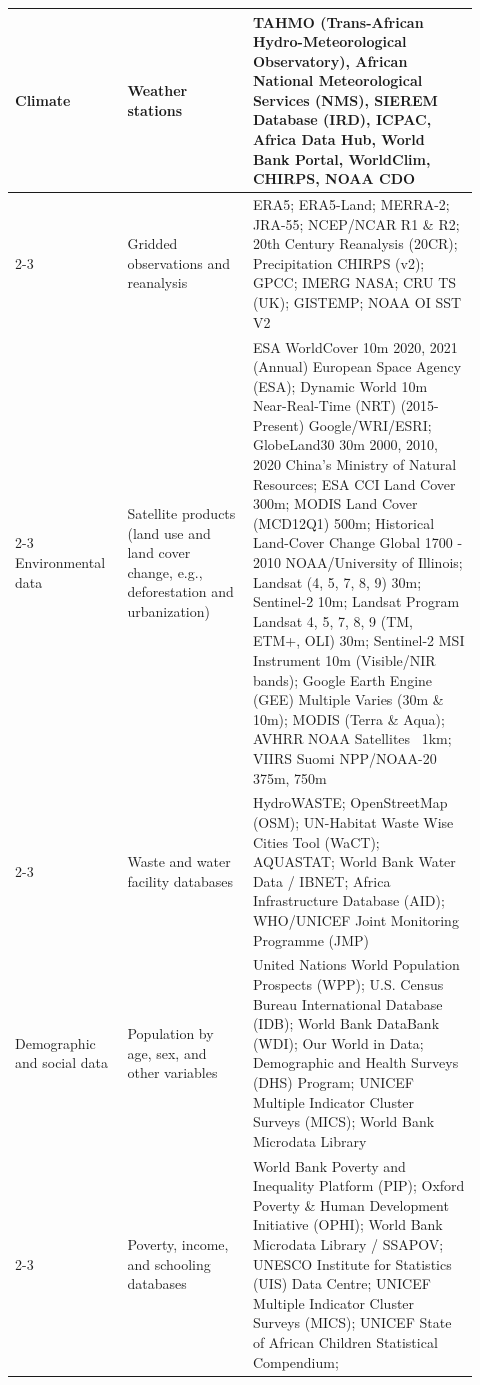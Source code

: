 \documentclass{article}
\begin{document}
\begin{longtable}{|p{0.22\linewidth}|p{0.25\linewidth}|p{0.45\linewidth}|}
    Climate & 
    Weather stations & 
    TAHMO (Trans-African Hydro-Meteorological Observatory), 
    African National Meteorological Services (NMS), 
    SIEREM Database (IRD), ICPAC, Africa Data Hub, World Bank Portal, WorldClim, CHIRPS, NOAA CDO \\
    \cline{2-3}
    & 
    Gridded observations and reanalysis & 
    ERA5; ERA5-Land; MERRA-2; JRA-55; NCEP/NCAR R1 \& R2; 
    20th Century Reanalysis (20CR); Precipitation CHIRPS (v2); 
    GPCC; IMERG NASA; CRU TS (UK); GISTEMP; NOAA OI SST V2 \\
    \cline{2-3}
    Environmental data &
    Satellite products (land use and land cover change, e.g., deforestation and urbanization) &
    ESA WorldCover 10m 2020, 2021 (Annual) European Space Agency (ESA);
    Dynamic World 10m Near-Real-Time (NRT) (2015-Present) Google/WRI/ESRI;
    GlobeLand30 30m 2000, 2010, 2020 China's Ministry of Natural Resources;
    ESA CCI Land Cover 300m;
    MODIS Land Cover (MCD12Q1) 500m;
    Historical Land-Cover Change Global 1700 - 2010 NOAA/University of Illinois;
    Landsat (4, 5, 7, 8, 9) 30m;
    Sentinel-2 10m;
    Landsat Program Landsat 4, 5, 7, 8, 9 (TM, ETM+, OLI) 30m;
    Sentinel-2 MSI Instrument 10m (Visible/NIR bands);
    Google Earth Engine (GEE) Multiple Varies (30m \& 10m);
    MODIS (Terra \& Aqua);
    AVHRR NOAA Satellites ~1km;
    VIIRS Suomi NPP/NOAA-20 375m, 750m \\
    \cline{2-3}
    &
    Waste and water facility databases &
    HydroWASTE;
    OpenStreetMap (OSM);
    UN-Habitat Waste Wise Cities Tool (WaCT);
    AQUASTAT;
    World Bank Water Data / IBNET;
    Africa Infrastructure Database (AID);
    WHO/UNICEF Joint Monitoring Programme (JMP) \\
    \hline
    Demographic and social data &
    Population by age, sex, and other variables &
    United Nations World Population Prospects (WPP);
    U.S. Census Bureau International Database (IDB);
    World Bank DataBank (WDI);
    Our World in Data;
    Demographic and Health Surveys (DHS) Program;
    UNICEF Multiple Indicator Cluster Surveys (MICS);
    World Bank Microdata Library \\
    \cline{2-3} 
    &
    Poverty, income, and schooling databases &
    World Bank Poverty and Inequality Platform (PIP);
    Oxford Poverty \& Human Development Initiative (OPHI);
    World Bank Microdata Library / SSAPOV;
    UNESCO Institute for Statistics (UIS) Data Centre;
    UNICEF Multiple Indicator Cluster Surveys (MICS);
    UNICEF State of African Children Statistical Compendium;

\end{longtable}
\end{document}
